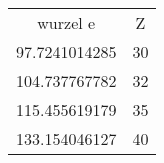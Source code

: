 \begin{table}
\begin{tabular}{cc}
wurzel e & Z \\
97.7241014285 & 30 \\
104.737767782 & 32 \\
115.455619179 & 35 \\
133.154046127 & 40 \\
\end{tabular}
\end{table}
